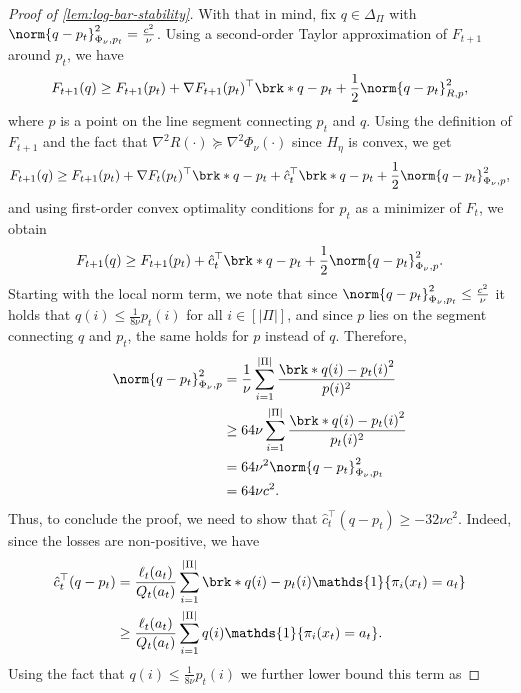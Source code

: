 \documentclass[11pt]{article}
\renewcommand{\ind}[1]{\mathds{1}\{#1\}}
\newcommand{\pred}{a}
\theoremstyle{plain}
\begin{document}
\begin{proof}[Proof of \cref{lem:log-bar-stability}]
    With that in mind, fix $q \in \Delta_\Pi$ with $\norm{q - p_t}^2_{\Phi_\nu,p_t} = \frac{c^2}{\nu}$. Using a second-order Taylor approximation of $F_{t+1}$ around $p_t$, we have
    \begin{align*}
        F_{t+1}(q) \geq F_{t+1}(p_t) + \nabla F_{t+1}(p_t)^\top \brk*{q-p_t} + \frac12 \norm{q-p_t}^2_{R,p},
    \end{align*}
    where $p$ is a point on the line segment connecting $p_t$ and $q$. Using the definition of $F_{t+1}$ and the fact that $\nabla^2 R(\cdot) \succeq \nabla^2 \Phi_\nu(\cdot)$ since $H_\eta$ is convex, we get
    \begin{align*}
        F_{t+1}(q) \geq F_{t+1}(p_t) + \nabla F_t(p_t)^\top \brk*{q - p_t} + \hat c_t^\top \brk*{q-p_t} + \frac12 \norm{q-p_t}^2_{\Phi_\nu,p},
    \end{align*}
    and using first-order convex optimality conditions for $p_t$ as a minimizer of $F_t$, we obtain
    \begin{align*}
        F_{t+1}(q) \geq F_{t+1}(p_t) + \hat c_t^\top \brk*{q-p_t} + \frac12 \norm{q-p_t}^2_{\Phi_\nu,p}.
    \end{align*}
    Starting with the local norm term, we note that since $\norm{q-p_t}^2_{\Phi_\nu,p_t} \leq \frac{c^2}{\nu}$ it holds that $q(i) \leq \frac{1}{8\nu} p_t(i)$ for all $i \in [|\Pi|]$, and since $p$ lies on the segment connecting $q$ and $p_t$, the same holds for $p$ instead of $q$. Therefore,
    \begin{align*}
        \norm{q-p_t}^2_{\Phi_\nu,p}
        &=
        \frac{1}{\nu} \sum_{i=1}^{|\Pi|} \frac{\brk*{q(i)-p_t(i)}^2}{p(i)^2} \\
        &\geq
        64 \nu \sum_{i=1}^{|\Pi|} \frac{\brk*{q(i)-p_t(i)}^2}{p_t(i)^2} \\
        &=
        64 \nu^2 \norm{q-p_t}^2_{\Phi_\nu,p_t} \\
        &=
        64 \nu c^2.
    \end{align*}
    Thus, to conclude the proof, we need to show that $\hat c_t^\top (q-p_t) \geq - 32 \nu c^2$. Indeed, since the losses are non-positive, we have
    \begin{align*}
        \hat c_t^\top (q-p_t)
        &= \frac{\ell_t(\pred_t)}{Q_t(\pred_t)} \sum_{i=1}^{|\Pi|} \brk*{q(i)-p_t(i)} \ind{\pi_i(x_t)=\pred_t} \\
        &\geq
        \frac{\ell_t(\pred_t)}{Q_t(\pred_t)} \sum_{i=1}^{|\Pi|} q(i) \ind{\pi_i(x_t)=\pred_t}.
    \end{align*}
    Using the fact that $q(i) \leq \frac{1}{8\nu}p_t(i)$ we further lower bound this term as

\end{proof}
\end{document}
